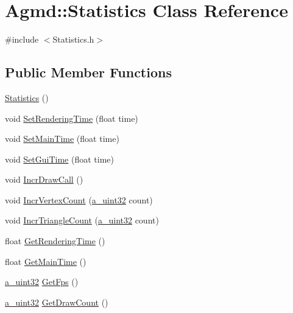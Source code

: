 \hypertarget{class_agmd_1_1_statistics}{\section{Agmd\+:\+:Statistics Class Reference}
\label{class_agmd_1_1_statistics}
}


{\ttfamily \#include $<$Statistics.\+h$>$}

\subsection*{Public Member Functions}
\begin{DoxyCompactItemize}
\item 
\hyperlink{class_agmd_1_1_statistics_a7d904f3880364763a37c3c8e00c8ce3e}{Statistics} ()
\item 
void \hyperlink{class_agmd_1_1_statistics_ac21288e51645fd4b5faf7be832f728cc}{Set\+Rendering\+Time} (float time)
\item 
void \hyperlink{class_agmd_1_1_statistics_a9e5a3be78145230d607c5e0882a0e1a8}{Set\+Main\+Time} (float time)
\item 
void \hyperlink{class_agmd_1_1_statistics_a6682ab4d8d83b78ced63874e3d283463}{Set\+Gui\+Time} (float time)
\item 
void \hyperlink{class_agmd_1_1_statistics_aa6179217977a70a4715f574d219def47}{Incr\+Draw\+Call} ()
\item 
void \hyperlink{class_agmd_1_1_statistics_ada6b1816f1e30e1c9229be9240e01218}{Incr\+Vertex\+Count} (\hyperlink{_common_defines_8h_a964296f9770051b9e4807b1f180dd416}{a\+\_\+uint32} count)
\item 
void \hyperlink{class_agmd_1_1_statistics_ad246a816cb57702cb6ea395dc1b542cd}{Incr\+Triangle\+Count} (\hyperlink{_common_defines_8h_a964296f9770051b9e4807b1f180dd416}{a\+\_\+uint32} count)
\item 
float \hyperlink{class_agmd_1_1_statistics_a27d3ee4f5522a64593fe4ba92a1dab64}{Get\+Rendering\+Time} ()
\item 
float \hyperlink{class_agmd_1_1_statistics_a61e468731bb4ca5180b053f2e1436db1}{Get\+Main\+Time} ()
\item 
\hyperlink{_common_defines_8h_a964296f9770051b9e4807b1f180dd416}{a\+\_\+uint32} \hyperlink{class_agmd_1_1_statistics_a24539c6606e16effe03fc4907939ec7d}{Get\+Fps} ()
\item 
\hyperlink{_common_defines_8h_a964296f9770051b9e4807b1f180dd416}{a\+\_\+uint32} \hyperlink{class_agmd_1_1_statistics_a4eaddf8f3af592193ee9728ceb3a4600}{Get\+Draw\+Count} ()

\end{DoxyCompactItemize}
